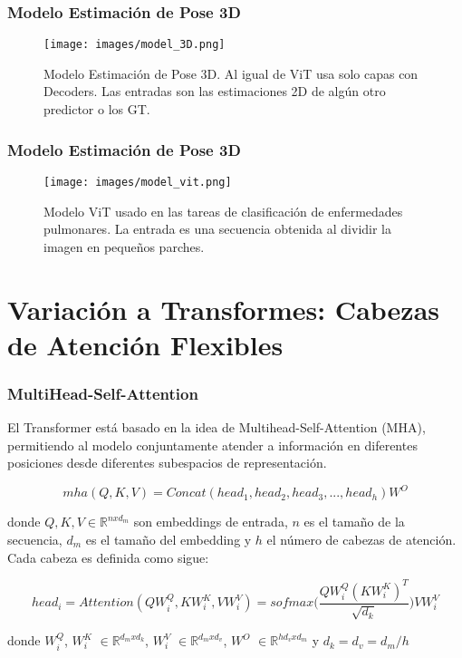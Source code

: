 \documentclass{beamer}
\begin{document}
\begin{frame}
\frametitle{Modelo Estimación de Pose 3D}

\begin{figure}[htbp]
    \centerline{\texttt{[image: images/model\_3D.png]}}
    \caption{Modelo Estimación de Pose 3D. Al igual de ViT usa solo capas con Decoders. Las entradas
             son las estimaciones 2D de algún otro predictor o los GT.}
    \label{fig:m3d}
\end{figure}

\end{frame}

\begin{frame}
\frametitle{Modelo Estimación de Pose 3D}

\begin{figure}[htbp]
    \centerline{\texttt{[image: images/model\_vit.png]}}
    \caption{Modelo ViT usado en las tareas de clasificación de enfermedades
             pulmonares. La entrada es una secuencia obtenida al dividir la imagen
             en pequeños parches.}
    \label{fig:vit}
\end{figure}

\end{frame}

\section{Variación a Transformes: Cabezas de Atención Flexibles}

\begin{frame}
\frametitle{MultiHead-Self-Attention}
El Transformer está basado en la idea de Multihead-Self-Attention (MHA), permitiendo al modelo
conjuntamente atender a información en diferentes posiciones desde diferentes subespacios de
representación.

\begin{equation*}
    mha(Q, K, V) = Concat(head_1,head_2,head_3,..., head_h)W^O
\end{equation*}

donde $Q, K, V \in \mathbb{R}^{nxd_{m}}$ son embeddings de entrada, $n$ es el tamaño de la
secuencia, $d_m$ es el tamaño del embedding y $h$ el número de cabezas de atención. Cada cabeza es
definida como sigue:

\begin{equation*}
    head_i = Attention(QW_i^Q, KW_i^K, VW_i^V) = sofmax\Big(\frac{QW_i^Q (KW_i^K)^T}{\sqrt{d_k}}\Big) VW_i^V
\end{equation*}

donde $W_i^Q$, $W_i^K$ $\in \mathbb{R}^{d_mxd_k}$, $W_i^V$ $\in \mathbb{R}^{d_mxd_v}$, $W^O$
$\in \mathbb{R}^{hd_vxd_m}$ y $d_k=d_v=d_m/h$

\end{frame}
\end{document}
